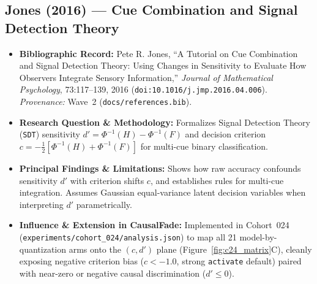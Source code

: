 \subsection{Jones (2016) --- Cue Combination and Signal Detection Theory \citep{jones2016cue}}
\begin{itemize}
  \item \textbf{Bibliographic Record:} Pete R. Jones, ``A Tutorial on Cue Combination and Signal Detection Theory: Using Changes in Sensitivity to Evaluate How Observers Integrate Sensory Information,'' \emph{Journal of Mathematical Psychology}, 73:117--139, 2016 (\texttt{doi:10.1016/j.jmp.2016.04.006}). \emph{Provenance:} Wave~2 (\texttt{docs/references.bib}).
  \item \textbf{Research Question \& Methodology:} Formalizes Signal Detection Theory (\texttt{SDT}) sensitivity $d' = \Phi^{-1}(H) - \Phi^{-1}(F)$ and decision criterion $c = -\frac{1}{2}[\Phi^{-1}(H) + \Phi^{-1}(F)]$ for multi-cue binary classification.
  \item \textbf{Principal Findings \& Limitations:} Shows how raw accuracy confounds sensitivity $d'$ with criterion shifts $c$, and establishes rules for multi-cue integration. Assumes Gaussian equal-variance latent decision variables when interpreting $d'$ parametrically.
  \item \textbf{Influence \& Extension in CausalFade:} Implemented in Cohort~024 (\texttt{experiments/cohort\_024/analysis.json}) to map all 21 model-by-quantization arms onto the $(c, d')$ plane (Figure~\ref{fig:c24_matrix}C), cleanly exposing negative criterion bias ($c < -1.0$, strong \texttt{activate} default) paired with near-zero or negative causal discrimination ($d' \le 0$).
\end{itemize}


